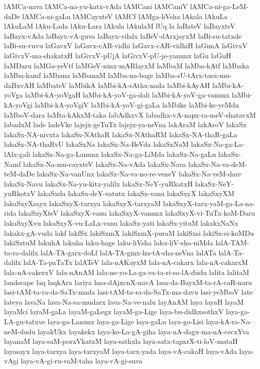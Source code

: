 {lAMCa-nava
lAMCa-na-yu-katx-vAda
lAMCani
lAMCaniV
lAMCa-ni-ga-LeM-daDe
lAMCa-ni-gaLu
lAMCayxteV
lAMCf
lAMga-liVsha
lAkala
lAkuLa
lAkuLaM
lAku-Lada
lAku-Lara
lAkula
lAkulaM
lUq
la
laBateV
laBayxteV
laBayx-vAda
laBayx-vA-guva
laBayx-vilalx
laBeV-dArxjayxM
laBi-su-tatxde
laBi-su-vuvu
laGavxV
laGavx-cAR-vidhi
laGavx-cAR-vidhiH
laGimA
laGivxV
laGivxV-ma-shakatxH
laGivxV-pUjA
laGivxV-pU-je-yanunx
laGu
laGuH
laMDaru
laMGa-yeVtf
laMGeV-ninx-mARlayxM
laMbaM
laMba-kAtf
laMbaka
laMba-kamf
laMbana
laMbanaM
laMba-na-bage
laMba-sU-tArx-tasx-mu-daBxvAH
laMbateV
laMbikA
laMbi-kA-sAthx-nada
laMbi-kAyAH
laMbi-kA-yoVga
laMbi-kA-yoVgaH
laMbi-kA-yoV-ga-dali
laMbi-kA-yoV-ga-vanunx
laMbi-kA-yoVgi
laMbi-kA-yoVgiV
laMbi-kA-yoV-gi-gaLa
laMbike
laMbi-ke-yeMdu
laMboV-dara
laMta-kAkxM-taka
labAdhxvX
labadhx-vA-napx-ra-meV-shatavxM
labadxM
lade
ladeVke
lajejx-geTuTx
lajejx-ya-neVna
lakAraM
lakAroV
lakaSx
lakaSx-NA-nivxta
lakaSx-NAthaR
lakaSx-NAthaRM
lakaSx-NA-thaR-gaLa
lakaSx-NA-thaRvU
lakaSxNa
lakaSx-Na-BeVda
lakaSxNaM
lakaSx-Na-ga-La-lAlx-gali
lakaSx-Na-ga-Lanunx
lakaSx-Na-ga-LiMda
lakaSx-Na-gaLu
lakaSx-Namf
lakaSx-Na-mu-cayxteV
lakaSx-Na-vAda
lakaSx-Nava
lakaSx-Na-va-deM-teM-daDe
lakaSx-Na-vanUnx
lakaSx-Na-va-no-re-veneY
lakaSx-Na-veM-dare
lakaSx-Navu
lakaSx-Na-yu-kitx-yalilx
lakaSx-NeY-yuRkatxH
lakaSx-NeY-yuRkotxV
lakaSxda
lakaSx-deY-vatutx
lakaSx-vanu
lakaSxyX
lakaSxyXM
lakaSxyXsayx
lakaSxyX-tarxya
lakaSxyX-tarxyaM
lakaSxyX-tarx-yaM-ga-La-na-rida
lakaSxyXteV
lakaSxyX-vanu
lakaSxyX-vanunx
lakaSxyX-vi-TuTx-koM-Daru
lakaSxyXvu
lakaSxyX-vu-LaLx-vanu
lakaSx-yati
lakaSx-yituM
lakakxNaNx
lakakx-gA-vuda
lakf
lakfSx
lakiSxmX
lakiSxmX-puraM
lakiSxsi
lakiSx-si-koMDu
lakiSxtuM
lakuhA
lakuha
laku-hage
laku-liVsha
laku-liV-sha-niMda
lalA-TAM-ta-ra-dalilx
lalA-TA-garx-doLf
lalA-TA-ginx-hu-tA-sha-neVna
lalATa
lalA-Ta-dalilx
lalA-Ta-paTaTx
lalATeV
lala-nAKayxM
lala-nA-cakarx
lala-nA-cakarxM
lala-nA-cakerxV
lala-nAnAM
lala-ne-yo-La-ga-va-ta-ri-sa-lA-dudu
lalita
lalitaM
landscape
laq
laqkAra
lariya
lasa-dAjxcnX-navA
lasa-da-BayxM-ta-rA-caR-naru
lasi-tAM-ta-ra-da-SaTx-mada
lasi-tAM-ta-ra-da-SaTx-ma-davu
lasi-yeMboV
late
lateya
lavaNa
lava-Na-sa-mudarx
lava-Na-ve-nalu
layAnAM
laya
layaH
layaM
layaMci
layaM-gaLa
layaM-gaLegx
layaM-ga-Lige
laya-bu-didhxsothxV
laya-ga-LA-gu-tatxve
laya-ga-Lanunx
laya-ga-Lige
laya-gaLu
laya-go-Lisi
laya-kA-ra-Na-neM-dudu
layakUkx
layakekx
laya-ko-La-gA-giha
laya-nA-dagx-ma-nA-cecxYva
layanaM
laya-saM-porxVkatxM
laya-sathxla
laya-satx-tapxrX-ti-loV-mataH
layasayx
laya-tarxya
laya-tarxyaM
laya-tarx-yada
laya-vA-cakaH
laya-vAda
laya-vAgi
laya-vA-gi-ru-vaM-taha
laya-vA-gi-suva
}
